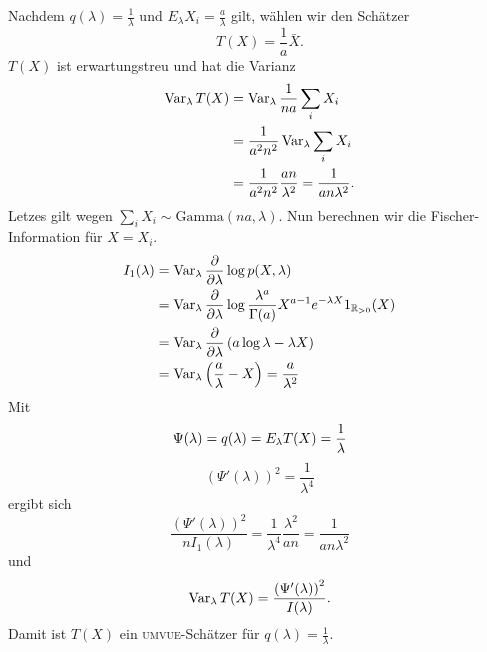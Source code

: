 Nachdem $q(\lambda)=\frac{1}{\lambda}$ und $E_\lambda X_i=\frac{a}{\lambda}$ gilt, 
wählen wir den Schätzer 
\begin{equation*}
    T(X)=\frac{1}{a}\bar X.
\end{equation*}
$T(X)$ ist erwartungstreu und hat
die Varianz
\begin{align*}
    \operatorname{Var}_\lambda T(X) &=  \operatorname{Var}_\lambda \frac{1}{na} \sum_{i}^{} X_i \\ 
    &= \frac{1}{a^2 n^2} \operatorname{Var}_\lambda \sum_{i}^{} X_i \\
    &= \frac{1}{a^2 n^2} \frac{an}{\lambda^2} = \frac{1}{an \lambda^2}. 
\end{align*}
Letzes gilt wegen $\sum_{i}^{} X_i \sim \textrm{Gamma}(na,\lambda)$. Nun
berechnen wir die Fischer-Information für $X=X_i$.
\begin{align*}
    I_1(\lambda) &= \operatorname{Var}_\lambda \frac{\partial}{\partial \lambda} \log p(X,\lambda) \\
    &= \operatorname{Var}_\lambda \frac{\partial}{\partial \lambda} \log \frac{\lambda^a}{\Gamma(a)} X^{a-1}e^{-\lambda X} 1_{\mathbb R_{>0}}(X) \\
    &= \operatorname{Var}_\lambda \frac{\partial}{\partial \lambda} \left( a \log \lambda - \lambda X \right) \\
    &= \operatorname{Var}_\lambda \left( \frac{a}{\lambda} - X \right) = \frac{a}{\lambda^2}
\end{align*}
Mit 
\begin{equation*}
    \Psi(\lambda) = q(\lambda)=E_\lambda T(X) =\frac{1}{\lambda} \\
\end{equation*}
\begin{equation*}
    \left( \Psi'(\lambda) \right)^2 = \frac{1}{\lambda^4}
\end{equation*}
ergibt sich 
\begin{equation*}
    \frac{  \left( \Psi'(\lambda) \right)^2 }{n I_1(\lambda)} 
    = \frac{1}{\lambda^4} \frac{\lambda^2}{an} = \frac{1}{ an \lambda^2}
\end{equation*}
und
\begin{equation*}
    \operatorname{Var}_{\lambda} T(X) = \frac{  \left( \Psi'(\lambda) \right)^2 }{I(\lambda)}.
\end{equation*}
Damit ist $T(X)$ ein \textsc{umvue}-Schätzer für $q(\lambda)=\frac{1}{\lambda}$.







